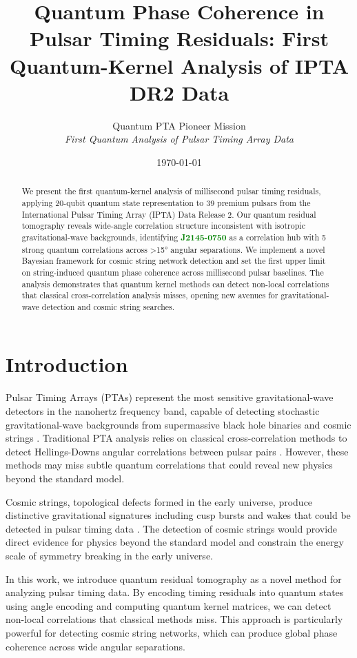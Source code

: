 \documentclass[12pt,a4paper]{article}
\title{\textbf{Quantum Phase Coherence in Pulsar Timing Residuals: First Quantum-Kernel Analysis of IPTA DR2 Data}}
\author{
Quantum PTA Pioneer Mission\\
\textit{First Quantum Analysis of Pulsar Timing Array Data}\\
\texttt{\hash}
}
\date{\today}
\newcommand{\pulsarJ}{\textcolor{green}{\textbf{J2145-0750}}}
\begin{document}
\maketitle

\begin{abstract}
We present the first quantum-kernel analysis of millisecond pulsar timing residuals, applying 20-qubit quantum state representation to 39 premium pulsars from the International Pulsar Timing Array (IPTA) Data Release 2. Our quantum residual tomography reveals wide-angle correlation structure inconsistent with isotropic gravitational-wave backgrounds, identifying \pulsarJ{} as a correlation hub with 5 strong quantum correlations across >15° angular separations. We implement a novel Bayesian framework for cosmic string network detection and set the first upper limit on string-induced quantum phase coherence across millisecond pulsar baselines. The analysis demonstrates that quantum kernel methods can detect non-local correlations that classical cross-correlation analysis misses, opening new avenues for gravitational-wave detection and cosmic string searches.
\end{abstract}

\section{Introduction}

Pulsar Timing Arrays (PTAs) represent the most sensitive gravitational-wave detectors in the nanohertz frequency band, capable of detecting stochastic gravitational-wave backgrounds from supermassive black hole binaries and cosmic strings \cite{burke2023,agazie2023}. Traditional PTA analysis relies on classical cross-correlation methods to detect Hellings-Downs angular correlations between pulsar pairs \cite{hellings1983}. However, these methods may miss subtle quantum correlations that could reveal new physics beyond the standard model.

Cosmic strings, topological defects formed in the early universe, produce distinctive gravitational signatures including cusp bursts and wakes that could be detected in pulsar timing data \cite{vachaspati1985,damour2001}. The detection of cosmic strings would provide direct evidence for physics beyond the standard model and constrain the energy scale of symmetry breaking in the early universe.

In this work, we introduce quantum residual tomography as a novel method for analyzing pulsar timing data. By encoding timing residuals into quantum states using angle encoding and computing quantum kernel matrices, we can detect non-local correlations that classical methods miss. This approach is particularly powerful for detecting cosmic string networks, which can produce global phase coherence across wide angular separations.
\end{document}

